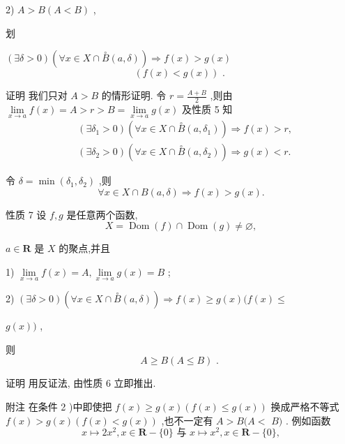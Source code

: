 2) $A > B\left( {A < B}\right)$ ,

划

$\left( {\exists \delta  > 0}\right) \left( {\forall x \in  X \cap  \overset{ \circ  }{B}\left( {a,\delta }\right) }\right)  \Rightarrow  f\left( x\right)  > g\left( x\right)$
$$\left( {f\left( x\right)  < g\left( x\right) }\right) \text{ . }$$

证明 我们只对 $A > B$ 的情形证明. 令 $r = \frac{A + B}{2}$ ,则由 $\mathop{\lim }\limits_{{x \rightarrow  a}}f\left( x\right)  = A > r > B = \mathop{\lim }\limits_{{x \rightarrow  a}}g\left( x\right)$ 及性质 5 知
\begin{align*}
	&\left( {\exists {\delta }_{1} > 0}\right) \left( {\forall x \in  X \cap  \overset{ \circ  }{B}\left( {a,{\delta }_{1}}\right) }\right)  \Rightarrow  f\left( x\right)  > r,\\
	&\left( {\exists {\delta }_{2} > 0}\right) \left( {\forall x \in  X \cap  \overset{ \circ  }{B}\left( {a,{\delta }_{2}}\right) }\right)  \Rightarrow  g\left( x\right)  < r.
\end{align*}

令 $\delta  = \min \left( {{\delta }_{1},{\delta }_{2}}\right)$ ,则
$$\forall x \in  X \cap  B\left( {a,\delta }\right)  \Rightarrow  f\left( x\right)  > g\left( x\right) .$$

性质 7 设 $f,g$ 是任意两个函数,
$$X = \operatorname{Dom}\left( f\right)  \cap  \operatorname{Dom}\left( g\right)  \neq  \varnothing ,$$

$a \in  \mathbf{R}$ 是 $X$ 的聚点,并且

1) $\mathop{\lim }\limits_{{x \rightarrow  a}}f\left( x\right)  = A,\mathop{\lim }\limits_{{x \rightarrow  a}}g\left( x\right)  = B$ ;

2) $\left( {\exists \delta  > 0}\right) \left( {\forall x \in  X \cap  \overset{ \circ  }{B}\left( {a,\delta }\right) }\right)  \Rightarrow  f\left( x\right)  \geq  g\left( x\right) (f\left( x\right)  \leq$

$g\left( x\right) )$ ,

则
$$A \geq  B\left( {A \leq  B}\right) \text{ . }$$

证明 用反证法, 由性质 6 立即推出.

附注 在条件 2 )中即使把 $f\left( x\right)  \geq  g\left( x\right) \left( {f\left( x\right)  \leq  g\left( x\right) }\right)$ 换成严格不等式 $f\left( x\right)  > g\left( x\right) \left( {f\left( x\right)  < g\left( x\right) }\right)$ ,也不一定有 $A > B(A <$  $B)$ . 例如函数
$$x \mapsto  2{x}^{2},x \in  \mathbf{R} - \{ 0\} \text{ 与 }x \mapsto  {x}^{2},x \in  \mathbf{R} - \{ 0\} ,$$

